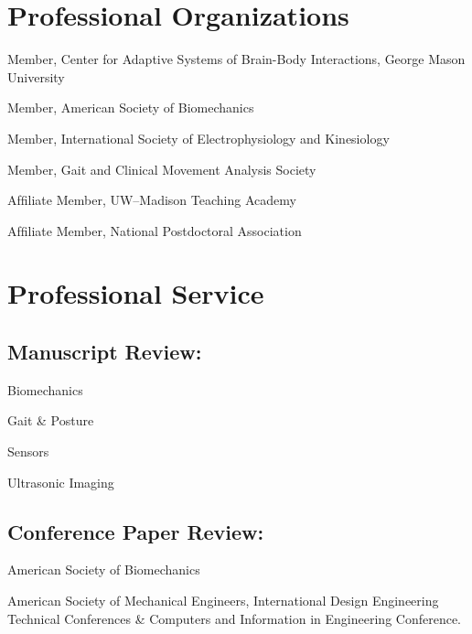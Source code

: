 \documentclass[letterpaper, 10pt]{article}
\begin{document}
\section{Professional Organizations}

\begin{compacthang}
     \item Member, Center for Adaptive Systems of Brain-Body Interactions, George Mason University
     \item Member, American Society of Biomechanics
     \item Member, International Society of Electrophysiology and Kinesiology
     \item Member, Gait and Clinical Movement Analysis Society
     \item Afﬁliate Member, UW--Madison Teaching Academy 
     \item Afﬁliate Member, National Postdoctoral Association
\end{compacthang}

\section{Professional Service}

\subsection{Manuscript Review:}
\setlength{\hangingleftmargin}{2.5em}
\setlength{\hangingindent}{2em}
\begin{compacthang}
    \item Biomechanics
    \item Gait \& Posture
    \item Sensors
    \item Ultrasonic Imaging
\end{compacthang}

\subsection{Conference Paper Review:}
\begin{hanginglist} %
    \item American Society of Biomechanics
    \item American Society of Mechanical Engineers, International Design Engineering Technical Conferences \& Computers and Information in Engineering Conference.
\end{hanginglist} %
\end{document}
